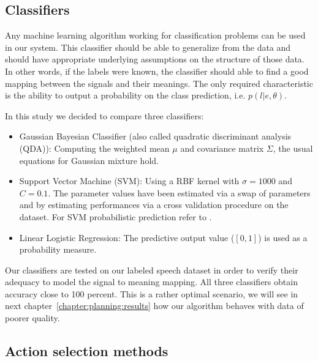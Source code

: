\subsection{Classifiers}

Any machine learning algorithm working for classification problems can be used in our system. This classifier should be able to generalize from the data and should have appropriate underlying assumptions on the structure of those data. In other words, if the labels were known, the classifier should able to find a good mapping between the signals and their meanings. The only required characteristic is the ability to output a probability on the class prediction, i.e. $p(l|e, \theta)$.

In this study we decided to compare three classifiers:
\begin{itemize}
\item Gaussian Bayesian Classifier (also called quadratic discriminant analysis (QDA)): Computing the weighted mean $\mu$ and covariance matrix $\Sigma$, the usual equations for Gaussian mixture hold.
\item Support Vector Machine (SVM): Using a RBF kernel with $\sigma = 1000$ and $C = 0.1$. The parameter values have been estimated via a swap of parameters and by estimating performances via a cross validation procedure on the dataset. For SVM probabilistic prediction refer to \cite{platt1999probabilistic}.
\item Linear Logistic Regression: The predictive output value ($[0,1]$) is used as a probability measure.
\end{itemize}

Our classifiers are tested on our labeled speech dataset in order to verify their adequacy to model the signal to meaning mapping. All three classifiers obtain accuracy close to 100 percent. This is a rather optimal scenario, we will see in next chapter~\ref{chapter:planning:results} how our algorithm behaves with data of poorer quality.

\subsection{Action selection methods}


